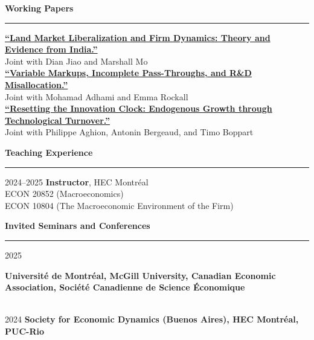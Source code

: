 \documentclass[12pt]{article}
\begin{document}
\vspace{0.5cm}

{\large \textbf{Working Papers}} \\
\noindent\rule[0.5\baselineskip]{\textwidth}{1pt}

\begin{small}
\href{https://drive.google.com/file/d/1z8lTR8R5P9uCwSs1FLgQa9mQ6WbSRwEo/view}{\textbf{``Land Market Liberalization and Firm Dynamics: Theory and Evidence from India.''}} \\
Joint with Dian Jiao and Marshall Mo \\[-0.5\baselineskip]

\href{https://jfbrou.github.io/papers/markups.pdf}{\textbf{``Variable Markups, Incomplete Pass-Throughs, and R\&D Misallocation.''}} \\
Joint with Mohamad Adhami and Emma Rockall \\[-0.5\baselineskip]

\href{https://jfbrou.github.io/papers/ABBB_2025.pdf}{\textbf{``Resetting the Innovation Clock: Endogenous Growth through Technological Turnover.''}} \\
Joint with Philippe Aghion, Antonin Bergeaud, and Timo Boppart
\end{small}

\clearpage

{\large \textbf{Teaching Experience}} \\
\noindent\rule[0.5\baselineskip]{\textwidth}{1pt}

\begin{small}
2024--2025 \tabto{3cm} \textbf{Instructor}, HEC Montr\'eal \\
\tabto{3cm} \hspace{0.25cm} ECON 20852 (Macroeconomics) \\
\tabto{3cm} \hspace{0.25cm} ECON 10804 (The Macroeconomic Environment of the Firm)
\end{small}

\vspace{0.5cm}

{\large \textbf{Invited Seminars and Conferences}} \\
\noindent\rule[0.5\baselineskip]{\textwidth}{1pt}

\begin{small}

2025 \tabto{3cm} \parbox[t]{13cm}{\textbf{Université de Montréal, McGill University, Canadian Economic Association, Société Canadienne de Science \'Economique}} \\

2024 \tabto{3cm} \textbf{Society for Economic
Dynamics (Buenos Aires), HEC Montr\'eal, PUC-Rio}

\end{small}
\end{document}
